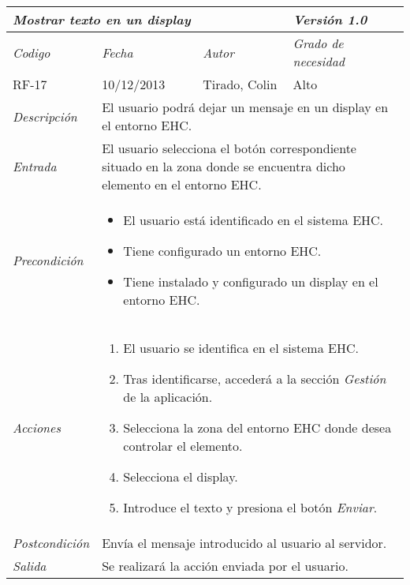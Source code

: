 \begin{tabular}{|p{3cm}|p{4cm}|p{4cm}|p{4cm}|}
\hline \multicolumn{3}{|p{9cm}|}{\textit{Mostrar texto en un display}} & \textit{Versi\'on 1.0} \\
\hline \textit{Codigo} & \textit{Fecha} & \textit{Autor} & \textit{Grado de necesidad} \\
RF-17 & 10/12/2013 & Tirado, Colin & Alto \\
\hline \textit{Descripci\'on} & \multicolumn{3}{|p{9cm}|}{El usuario podr\'a dejar un mensaje en un display en el entorno EHC.} \\
\hline \textit{Entrada} & \multicolumn{3}{|p{9cm}|}{El usuario selecciona el bot\'on correspondiente situado en la zona donde se encuentra dicho elemento en el entorno EHC.} \\
\hline \textit{Precondici\'on} & \multicolumn{3}{|p{9cm}|}{
\begin{itemize}
\item El usuario est\'a identificado en el sistema EHC.
\item Tiene configurado un entorno EHC.
\item Tiene instalado y configurado un display en el entorno EHC.
\end{itemize}
} \\
\hline \textit{Acciones} & \multicolumn{3}{|p{9cm}|}{
\begin{enumerate}
\item El usuario se identifica en el sistema EHC.
\item Tras identificarse, acceder\'a a la secci\'on \textit{Gesti\'on} de la aplicaci\'on.
\item Selecciona la zona del entorno EHC donde desea controlar el elemento.
\item Selecciona el display.
\item Introduce el texto y presiona el bot\'on \textit{Enviar}.
\end{enumerate}
} \\
\hline \textit{Postcondici\'on} & \multicolumn{3}{|p{9cm}|}{Env\'ia el mensaje introducido al usuario al servidor.} \\
\hline \textit{Salida} & \multicolumn{3}{|p{9cm}|}{Se realizar\'a la acci\'on enviada por el usuario.} \\ \hline
\end{tabular}